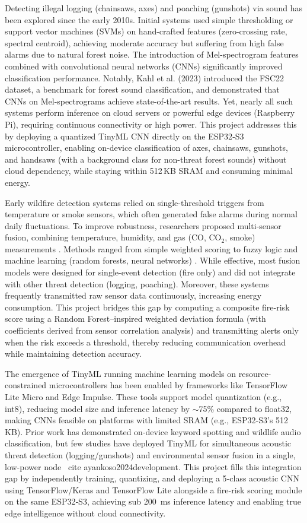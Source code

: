 Detecting illegal logging (chainsaws, axes) and poaching (gunshots) via sound has been explored since the early 2010s. Initial systems used simple thresholding or support vector machines (SVMs) on hand-crafted features (zero-crossing rate, spectral centroid), achieving moderate accuracy but suffering from high false alarms due to natural forest noise. The introduction of Mel-spectrogram features combined with convolutional neural networks (CNNs) significantly improved classification performance. Notably, Kahl et al. (2023) introduced the FSC22 dataset, a benchmark for forest sound classification, and demonstrated that CNNs \cite{bandara2023forest} on Mel-spectrograms achieve state-of-the-art results. Yet, nearly all such systems perform inference on cloud servers or powerful edge devices (Raspberry Pi), requiring continuous connectivity or high power. This project addresses this by deploying a quantized TinyML CNN directly on the ESP32‑S3 microcontroller, enabling on-device classification of axes, chainsaws, gunshots, and handsaws (with a background class for non-threat forest sounds) without cloud dependency, while staying within 512\,KB SRAM and consuming minimal energy.

Early wildfire detection systems relied on single-threshold triggers from temperature or smoke sensors, which often generated false alarms during normal daily fluctuations. To improve robustness, researchers proposed multi-sensor fusion, combining temperature, humidity, and gas (CO, CO$_2$, smoke) measurements \cite{patel2025forestguard}. Methods ranged from simple weighted scoring to fuzzy logic and machine learning (random forests, neural networks) \cite{saida2023lora}. While effective, most fusion models were designed for single-event detection (fire only) and did not integrate with other threat detection (logging, poaching). Moreover, these systems frequently transmitted raw sensor data continuously, increasing energy consumption. This project bridges this gap by computing a composite fire-risk score using a Random Forest–inspired weighted deviation formula (with coefficients derived from sensor correlation analysis) and transmitting alerts only when the risk exceeds a threshold, thereby reducing communication overhead while maintaining detection accuracy.

The emergence of TinyML running machine learning models on resource-constrained microcontrollers has been enabled by frameworks like TensorFlow Lite Micro and Edge Impulse. These tools support model quantization (e.g., int8), reducing model size and inference latency by $\sim$75\% compared to float32, making CNNs feasible on platforms with limited SRAM (e.g., ESP32‑S3’s 512\, KB). Prior work has demonstrated on-device keyword spotting and wildlife audio classification, but few studies have deployed TinyML for simultaneous acoustic threat detection (logging/gunshots) and environmental sensor fusion in a single, low-power node \ cite {ayankoso2024development}. This project fills this integration gap by independently training, quantizing, and deploying a 5‑class acoustic CNN using TensorFlow/Keras and TensorFlow Lite alongside a fire-risk scoring module on the same ESP32‑S3, achieving sub 200\, ms inference latency and enabling true edge intelligence without cloud connectivity.

